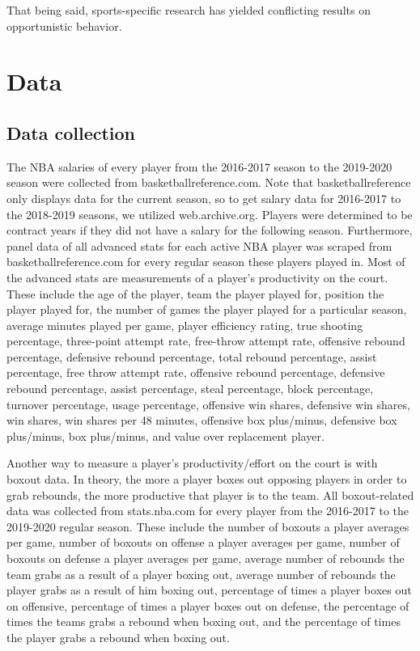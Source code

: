 \documentclass[12pt]{article}
\begin{document}
	That being said, sports-specific research has yielded conflicting results on opportunistic behavior.
	
	
	\section{Data} \label{sec:data}
	
	\subsection{Data collection}
	
	The NBA salaries of every player from the 2016-2017 season to the 2019-2020 season were collected from basketballreference.com. Note that basketballreference only displays data for the current season, so to get salary data for 2016-2017 to the 2018-2019 seasons, we utilized web.archive.org. Players were determined to be contract years if they did not have a salary for the following season. Furthermore, panel data of all advanced stats for each active NBA player was scraped from basketballreference.com for every regular season these players played in. Most of the advanced stats are measurements of a player's productivity on the court. These include the age of the player, team the player played for, position the player played for, the number of games the player played for a particular season, average minutes played per game, player efficiency rating, true shooting percentage, three-point attempt rate, free-throw attempt rate, offensive rebound percentage, defensive rebound percentage, total rebound percentage, assist percentage, free throw attempt rate, offensive rebound percentage, defensive rebound percentage, assist percentage, steal percentage, block percentage, turnover percentage, usage percentage, offensive win shares, defensive win shares, win shares, win shares per 48 minutes, offensive box plus/minus, defensive box plus/minus, box plus/minus, and value over replacement player. 
	
	Another way to measure a player's productivity/effort on the court is with boxout data. In theory, the more a player boxes out opposing players in order to grab rebounds, the more productive that player is to the team. All boxout-related data was collected from stats.nba.com for every player from the 2016-2017 to the 2019-2020 regular season. These include the number of boxouts a player averages per game, number of boxouts on offense a player averages per game, number of boxouts on defense a player averages per game, average number of rebounds the team grabs as a result of a player boxing out, average number of rebounds the player grabs as a result of him boxing out, percentage of times a player boxes out on offensive, percentage of times a player boxes out on defense, the percentage of times the teams grabs a rebound when boxing out, and the percentage of times the player grabs a rebound when boxing out. 
	
\end{document}
